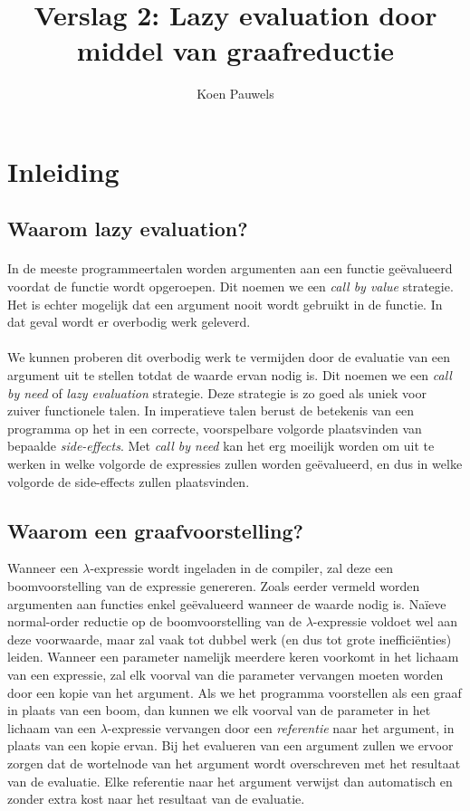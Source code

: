 \documentclass[a4paper,10pt]{article}
\begin{document}
\lstset{language=Haskell}
\title{Verslag 2: Lazy evaluation door middel van graafreductie}
\author{Koen Pauwels}
\maketitle

\section{Inleiding}
\subsection{Waarom lazy evaluation?}
\paragraph{}
In de meeste programmeertalen worden argumenten aan een functie ge{\"e}valueerd voordat de functie wordt opgeroepen.
Dit noemen we een \emph{call by value} strategie.
Het is echter mogelijk dat een argument nooit wordt gebruikt in de functie.
In dat geval wordt er overbodig werk geleverd.
\paragraph{}
We kunnen proberen dit overbodig werk te vermijden door de evaluatie van een argument uit te stellen totdat de waarde ervan nodig is.
Dit noemen we een \emph{call by need} of \emph{lazy evaluation} strategie.
Deze strategie is zo goed als uniek voor zuiver functionele talen.
In imperatieve talen berust de betekenis van een programma op het in een correcte, voorspelbare volgorde plaatsvinden van bepaalde \emph{side-effects}.
Met \emph{call by need} kan het erg moeilijk worden om uit te werken in welke volgorde de expressies zullen worden ge{\"e}valueerd, en dus in welke volgorde de side-effects zullen plaatsvinden.

\subsection{Waarom een graafvoorstelling?}
Wanneer een $\lambda$-expressie wordt ingeladen in de compiler, zal deze een boomvoorstelling van de expressie genereren.
Zoals eerder vermeld worden argumenten aan functies enkel ge{\"e}valueerd wanneer de waarde nodig is.
Na{\"i}eve normal-order reductie op de boomvoorstelling van de $\lambda$-expressie voldoet wel aan deze voorwaarde, maar zal vaak tot dubbel werk (en dus tot grote ineffici{\"e}nties) leiden.
Wanneer een parameter namelijk meerdere keren voorkomt in het lichaam van een expressie, zal elk voorval van die parameter vervangen moeten worden door een kopie van het argument.
Als we het programma voorstellen als een graaf in plaats van een boom, dan kunnen we elk voorval van de parameter in het lichaam van een $\lambda$-expressie vervangen door een \emph{referentie} naar het argument, in plaats van een kopie ervan.
Bij het evalueren van een argument zullen we ervoor zorgen dat de wortelnode van het argument wordt overschreven met het resultaat van de evaluatie.
Elke referentie naar het argument verwijst dan automatisch en zonder extra kost naar het resultaat van de evaluatie.
\end{document}

